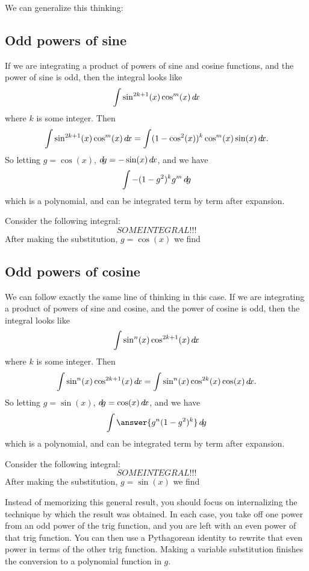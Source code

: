 \documentclass{ximera}
\begin{document}
We can generalize this thinking:

\subsection{Odd powers of sine}

If we are integrating a product of powers of sine and cosine
functions, and the power of sine is odd, then the integral looks like
\[
\int \sin^{2k+1}(x) \cos^m(x) \mathop{}\!d\! x
\]
where $k$ is some integer.  Then
\[
\int \sin^{2k+1}(x) \cos^m(x) \mathop{}\!d\! x = \int (1-\cos^2(x))^k \cos^m(x) \sin(x)\mathop{}\!d\! x.
\]
So letting $g = \cos(x)$, $\mathop{}\!d\! g =-\sin(x) \mathop{}\!d\! x$, and we have
\[
\int -(1-g^2)^k g^m \mathop{}\!d\! g
\]
which is a polynomial, and can be integrated term by term after
expansion.


\begin{question}
  Consider the following integral:
  \[
  SOME INTEGRAL!!!
  \]
  After making the substitution, $g = \cos(x)$ we find
  \begin{multipleChoice}
  \end{multipleChoice}
\end{question}



\subsection{Odd powers of cosine}

We can follow exactly the same line of thinking in this case. If we
are integrating a product of powers of sine and cosine, and the power
of cosine is odd, then the integral looks like
\[
\int \sin^n(x) \cos^{2k+1}(x) \mathop{}\!d\! x
\]
where $k$ is some integer. Then
\[
\int \sin^n(x) \cos^{2k+1}(x) \mathop{}\!d\! x = \int \sin^n(x) \cos^{2k}(x) \cos(x) \mathop{}\!d\! x.
\]
So letting $g = \sin(x)$, $\mathop{}\!d\! g =\cos(x) \mathop{}\!d\! x$, and we have 
\[
\int \answer{ g^n(1-g^2)^k} \d g
\]
which is a polynomial, and can be integrated term by term after
expansion.

\begin{question}
  Consider the following integral:
  \[
  SOME INTEGRAL!!!
  \]
  After making the substitution, $g = \sin(x)$ we find
  \begin{multipleChoice}
  \end{multipleChoice}
\end{question}


\begin{warning}
Instead of memorizing this general result, you should focus on
internalizing the technique by which the result was obtained.  In each
case, you take off one power from an odd power of the trig function,
and you are left with an even power of that trig function.  You can
then use a Pythagorean identity to rewrite that even power in terms of
the other trig function.  Making a variable substitution finishes the
conversion to a polynomial function in $g$.
\end{warning}
\end{document}
